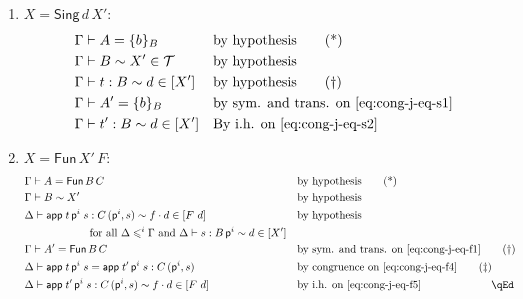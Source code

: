 \documentclass{LMCS}
\theoremstyle{plain}\newtheorem{satz}[thm]{Satz}
\newcommand{\proofLine}[2]{&#1&&\text{#2}}
\newcommand{\exsubs}[2]{( #1, #2)}
\newcommand{\subsTm}[2]{#1\,#2}
\newcommand{\subsTy}[2]{#1\,#2}
\newcommand{\F}[2]{\mathsf{Fun}\,#1\,#2}
\newcommand{\p}{\mathsf{p}}
\newcommand{\appTm}[2]{\mathsf{app}\;#1\;#2} \newcommand{\singTm}[2]{\{#1\}_{#2}}
\newcommand{\dtype}[2]{#1\vdash#2}
\newcommand{\dterm}[3]{#1\vdash#3:#2}
\newcommand{\deqtype}[3]{#1\vdash#2=#3}
\newcommand{\deqterm}[4]{#1\vdash#3=#4:#2}
\newcommand{\lift}[2]{\subsTm{#2}{\p^{#1}}}
\newcommand{\perT}{\mathcal{T}}
\newcommand{\rel}{\sim}
\newcommand{\iPi}[2]{\mathsf{Fun}\,#1\,#2}
\newcommand{\iSing}[2]{\mathsf{Sing}\,#1\,{#2}}
\begin{document}
{\begin{enumerate}[(a)]
\begin{enumerate}[(1)]
    \item $X = \iSing{d}{X'}$: 
      \begin{align*}
      \proofLine{\deqtype{\Gamma}{A}{\singTm{b}{B}}}{by hypothesis}\tag{*}\label{eq:cong-j-eq-s1}\\
      \proofLine{\dtype{\Gamma}{B}\rel X' \in \perT}{by hypothesis}\\
      \proofLine{\dterm{\Gamma}{B}{t}\rel d\in [X']}{by hypothesis}  \tag{\textdagger}\label{eq:cong-j-eq-s2}\\
      \proofLine{\deqtype{\Gamma}{A'}{\singTm{b}{B}}}{by sym. and trans. on \eqref{eq:cong-j-eq-s1}}\\
      \proofLine{\dterm{\Gamma}{B}{t'}\rel d\in [X']}{By i.h. on \eqref{eq:cong-j-eq-s2}} 
    \end{align*}
  \item $X = \iPi{X'}{F}$: 
      \begin{align*}
        \proofLine{\deqtype{\Gamma}{A}{\F{B}{C}}}{by hypothesis} \tag{*}\label{eq:cong-j-eq-f1}&\\
        \proofLine{\dtype{\Gamma}{B}\rel X'}{by hypothesis}\\
        \proofLine{\dterm{\Delta}{\subsTy{C}{\exsubs{\p^i}{s}}}{\appTm{\lift{i}{t}}{s}} \rel f\cdot d \in [F\ d]}
          {by hypothesis}\\
        & \text{\hspace{2cm} for all }\Delta\leqslant^i\Gamma \text{ and }
        \dterm{\Delta}{\lift{i}{B}}{s} \rel d\in [X']  &&\\
        \proofLine{\deqtype{\Gamma}{A'}{\F{B}{C}} }{by sym. and trans. on \eqref{eq:cong-j-eq-f1}}
        \tag{\textdagger} \label{eq:cong-j-eq-f4}\\
        \proofLine{\deqterm{\Delta}{\subsTy{C}{\exsubs{\p^i}{s}}}{\appTm{\lift{i}{t}}{s}}{\appTm{\lift{i}{t'}}{s}}}{by congruence on \eqref{eq:cong-j-eq-f4}}\tag{\textdaggerdbl} \label{eq:cong-j-eq-f5}\\
        \proofLine{\dterm{\Delta}{\subsTy{C}{\exsubs{\p^i}{s}}}{\appTm{\lift{i}{t'}}{s}} \rel f\cdot d \in [F\ d]}
          {by i.h. on \eqref{eq:cong-j-eq-f5}}\rlap{\hbox to 86pt{\hfill\qEd}}
      \end{align*}
    \end{enumerate}
  \end{enumerate}
}
\end{document}
